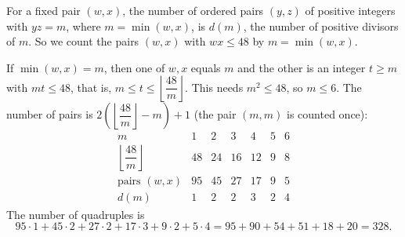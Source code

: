 For a fixed pair $(w,x)$, the number of ordered pairs $(y,z)$ of positive integers with $yz=m$, where $m=\min(w,x)$, is $d(m)$, the number of positive divisors of $m$. So we count the pairs $(w,x)$ with $wx\le48$ by $m=\min(w,x)$.

If $\min(w,x)=m$, then one of $w,x$ equals $m$ and the other is an integer $t\ge m$ with $mt\le48$, that is, $m\le t\le\left\lfloor\dfrac{48}{m}\right\rfloor$. This needs $m^2\le48$, so $m\le6$. The number of pairs is $2\left(\left\lfloor\dfrac{48}{m}\right\rfloor-m\right)+1$ (the pair $(m,m)$ is counted once):
\[\begin{array}{c|cccccc}
m&1&2&3&4&5&6\\\hline
\left\lfloor\dfrac{48}{m}\right\rfloor&48&24&16&12&9&8\\
\text{pairs }(w,x)&95&45&27&17&9&5\\
d(m)&1&2&2&3&2&4
\end{array}\]
The number of quadruples is
\[95\cdot1+45\cdot2+27\cdot2+17\cdot3+9\cdot2+5\cdot4=95+90+54+51+18+20=\boxed{328}.\]

